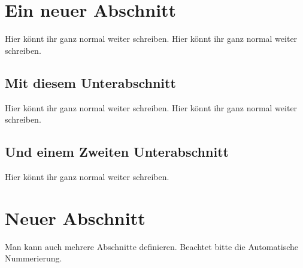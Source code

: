 \documentclass{article}
\begin{document}
\tableofcontents
\section{Ein neuer Abschnitt}
Hier könnt ihr ganz normal weiter schreiben. Hier könnt ihr ganz normal weiter schreiben. 
\subsection{Mit diesem Unterabschnitt}
Hier könnt ihr ganz normal weiter schreiben. Hier könnt ihr ganz normal weiter schreiben.
\subsection{Und einem Zweiten Unterabschnitt}
Hier könnt ihr ganz normal weiter schreiben.
\section{Neuer Abschnitt}
Man kann auch mehrere Abschnitte definieren. Beachtet bitte die Automatische Nummerierung. 
\end{document}
